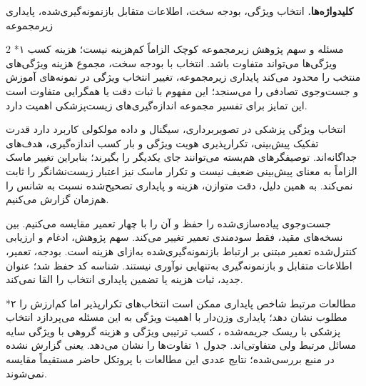 \documentclass[10pt,a4paper]{article}
\makeatletter
\renewcommand{\section}{\@startsection{section}{1}{0pt}{5pt}{2pt}{\normalfont\normalsize\bfseries}}
\newcommand{\sect}[1]{\section*{#1}}
\makeatother
\begin{document}
\textbf{کلیدواژه‌ها. } انتخاب ویژگی، بودجه سخت، اطلاعات متقابل بازنمونه‌گیری‌شده، پایداری زیرمجموعه
\begin{multicols}{2}\raggedcolumns
\sect{۱  مسئله و سهم پژوهش}
زیرمجموعه کوچک الزاماً کم‌هزینه نیست؛ هزینه کسب ویژگی‌ها می‌تواند متفاوت باشد. انتخاب با بودجه سخت، مجموع هزینه ویژگی‌های منتخب را محدود می‌کند  پایداری زیرمجموعه، تغییر انتخاب ویژگی در نمونه‌های آموزش و جست‌وجوی تصادفی را می‌سنجد؛ این مفهوم با ثبات دقت یا همگرایی متفاوت است  این تمایز برای تفسیر مجموعه اندازه‌گیری‌های زیست‌پزشکی اهمیت دارد.

انتخاب ویژگی پزشکی در تصویربرداری، سیگنال و داده مولکولی کاربرد دارد  قدرت تفکیک پیش‌بینی، تکرارپذیری هویت ویژگی و بار کسب اندازه‌گیری، هدف‌های جداگانه‌اند. توصیفگرهای هم‌بسته می‌توانند جای یکدیگر را بگیرند؛ بنابراین تغییر ماسک الزاماً به معنای پیش‌بینی ضعیف نیست و تکرار ماسک نیز اعتبار زیست‌نشانگر را ثابت نمی‌کند. به همین دلیل، دقت متوازن، هزینه و پایداری تصحیح‌شده نسبت به شانس را هم‌زمان گزارش می‌کنیم.

جست‌وجوی پیاده‌سازی‌شده  را حفظ و آن را با چهار تعمیر مقایسه می‌کنیم. بین نسخه‌های مقید، فقط سودمندی تعمیر تغییر می‌کند. سهم پژوهش، ادغام و ارزیابی کنترل‌شده تعمیر مبتنی بر ارتباط بازنمونه‌گیری‌شده به‌ازای هزینه است. بودجه، تعمیر، اطلاعات متقابل  و بازنمونه‌گیری به‌تنهایی نوآوری نیستند. شناسه کد  حفظ شد؛ عنوان جدید، ثبات هزینه یا تضمین پایداری انتخاب را القا نمی‌کند.

\sect{۲  مطالعات مرتبط}
شاخص پایداری ممکن است انتخاب‌های تکرارپذیر اما کم‌ارزش را مطلوب نشان دهد؛ پایداری وزن‌دار با اهمیت ویژگی به این مسئله می‌پردازد  انتخاب پزشکی با ریسک جریمه‌شده \lr{[6]}، کسب ترتیبی ویژگی \lr{[7]} و هزینه گروهی با ویژگی سایه \lr{[8]} مسائل مرتبط ولی متفاوتی‌اند. جدول ۱ تفاوت‌ها را نشان می‌دهد.  یعنی گزارش نشده در منبع بررسی‌شده؛ نتایج عددی این مطالعات با پروتکل حاضر مستقیماً مقایسه نمی‌شوند.


\end{multicols}
\end{document}
